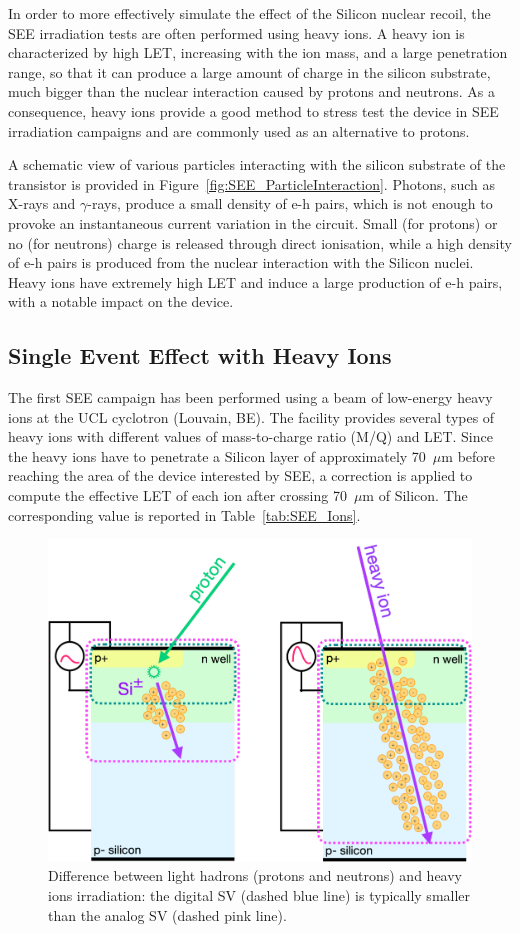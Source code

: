In order to more effectively simulate the effect of the Silicon nuclear recoil, the SEE irradiation tests are often performed using heavy ions. 
A heavy ion is characterized by high LET, increasing with the ion mass, and a large penetration range, so that it can produce a large amount of charge in the silicon substrate, much bigger than the nuclear interaction caused by protons and neutrons.
As a consequence, heavy ions provide a good method to stress test the device in SEE irradiation campaigns and are commonly used as an alternative to protons.

\bigbreak

A schematic view of various particles interacting with the silicon substrate of the transistor is provided in Figure~\ref{fig:SEE_ParticleInteraction}.
Photons, such as X-rays and $\gamma$-rays, produce a small density of e-h pairs, which is not enough to provoke an instantaneous current variation in the circuit. 
Small (for protons) or no (for neutrons) charge is released through direct ionisation, while a high density of e-h pairs is produced from the nuclear interaction with the Silicon nuclei. Heavy ions have extremely high LET and induce a large production of e-h pairs, with a notable impact on the device.


\subsection{Single Event Effect with Heavy Ions}
\label{subsec:SEE with Heavy Ions}

The first SEE campaign has been performed using a beam of low-energy heavy ions at the UCL cyclotron (Louvain, BE).
The facility provides several types of heavy ions with different values of mass-to-charge ratio (M/Q) and LET.
Since the heavy ions have to penetrate a Silicon layer of approximately 70~$\mu$m before reaching the area of the device interested by SEE, a correction is applied to compute the effective LET of each ion after crossing 70~$\mu$m of Silicon. The corresponding value is reported in Table~\ref{tab:SEE_Ions}.

\begin{figure}[t]
    \centering
    \includegraphics[width=0.45\linewidth]{Figures/HGCAL/SEE_SV.pdf}
    \caption{Difference between light hadrons (protons and neutrons) and heavy ions irradiation: the digital SV (dashed blue line) is typically smaller than the analog SV (dashed pink line).}
    \label{fig:sensitivevolume}
\end{figure}

